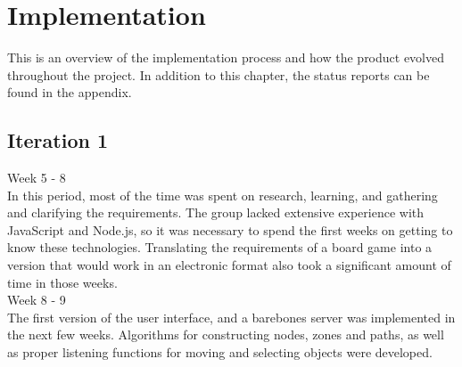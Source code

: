 \chapter{Implementation}

This is an overview of the implementation process and how the product evolved throughout the project. In addition to this chapter, the status reports can be found in the appendix. \\

\section{Iteration 1}

Week 5 - 8\\
\newline
In this period, most of the time was spent on research, learning, and gathering and clarifying the requirements. The group lacked extensive experience with JavaScript and Node.js, so it was necessary to spend the first weeks on getting to know these technologies. Translating the requirements of a board game into a version that would work in an electronic format also took a significant amount of time in those weeks.\\
\newline
Week 8 - 9\\
\newline
The first version of the user interface, and a barebones server was implemented in the next few weeks. Algorithms for constructing nodes, zones and paths, as well as proper listening functions for moving and selecting objects were developed.\\

